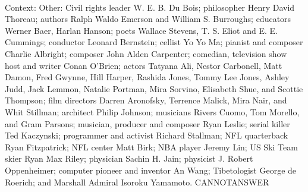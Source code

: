 \documentclass[11pt,a4paper, onecolumn]{article}
\begin{document}
\\ Context: Other: Civil rights leader W. E. B. Du Bois; philosopher Henry David Thoreau; authors Ralph Waldo Emerson and William S. Burroughs; educators Werner Baer, Harlan Hanson; poets Wallace Stevens, T. S. Eliot and E. E. Cummings; conductor Leonard Bernstein; cellist Yo Yo Ma; pianist and composer Charlie Albright; composer John Alden Carpenter; comedian, television show host and writer Conan O'Brien; actors Tatyana Ali, Nestor Carbonell, Matt Damon, Fred Gwynne, Hill Harper, Rashida Jones, Tommy Lee Jones, Ashley Judd, Jack Lemmon, Natalie Portman, Mira Sorvino, Elisabeth Shue, and Scottie Thompson; film directors Darren Aronofsky, Terrence Malick, Mira Nair, and Whit Stillman; architect Philip Johnson; musicians Rivers Cuomo, Tom Morello, and Gram Parsons; musician, producer and composer Ryan Leslie; serial killer Ted Kaczynski; programmer and activist Richard Stallman; NFL quarterback Ryan Fitzpatrick; NFL center Matt Birk; NBA player Jeremy Lin; US Ski Team skier Ryan Max Riley; physician Sachin H. Jain; physicist J. Robert Oppenheimer; computer pioneer and inventor An Wang; Tibetologist George de Roerich; and Marshall Admiral Isoroku Yamamoto. CANNOTANSWER
\end{document}
